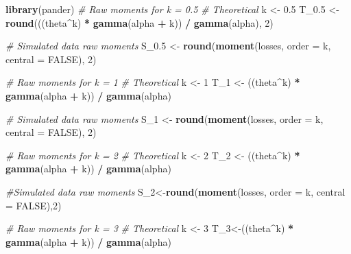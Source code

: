 \documentclass[]{book}
\newenvironment{Shaded}{\begin{snugshade}}{\end{snugshade}}
\newcommand{\KeywordTok}[1]{\textcolor[rgb]{0.13,0.29,0.53}{\textbf{#1}}}
\newcommand{\DataTypeTok}[1]{\textcolor[rgb]{0.13,0.29,0.53}{#1}}
\newcommand{\DecValTok}[1]{\textcolor[rgb]{0.00,0.00,0.81}{#1}}
\newcommand{\FloatTok}[1]{\textcolor[rgb]{0.00,0.00,0.81}{#1}}
\newcommand{\StringTok}[1]{\textcolor[rgb]{0.31,0.60,0.02}{#1}}
\newcommand{\CommentTok}[1]{\textcolor[rgb]{0.56,0.35,0.01}{\textit{#1}}}
\newcommand{\OtherTok}[1]{\textcolor[rgb]{0.56,0.35,0.01}{#1}}
\newcommand{\OperatorTok}[1]{\textcolor[rgb]{0.81,0.36,0.00}{\textbf{#1}}}
\newcommand{\NormalTok}[1]{#1}
\theoremstyle{definition}
\theoremstyle{definition}
\theoremstyle{definition}
\theoremstyle{remark}
\begin{document}
\begin{Shaded}
\begin{Highlighting}[]
\KeywordTok{library}\NormalTok{(pander)}
\CommentTok{# Raw moments for k = 0.5}
\CommentTok{# Theoretical }
\NormalTok{k <-}\StringTok{ }\FloatTok{0.5}
\NormalTok{T_}\FloatTok{0.5}\NormalTok{ <-}\StringTok{ }\KeywordTok{round}\NormalTok{(((theta}\OperatorTok{^}\NormalTok{k) }\OperatorTok{*}\StringTok{ }\KeywordTok{gamma}\NormalTok{(alpha }\OperatorTok{+}\StringTok{ }\NormalTok{k)) }\OperatorTok{/}\StringTok{ }\KeywordTok{gamma}\NormalTok{(alpha), }\DecValTok{2}\NormalTok{)}

\CommentTok{# Simulated data raw moments}
\NormalTok{S_}\FloatTok{0.5}\NormalTok{ <-}\StringTok{ }\KeywordTok{round}\NormalTok{(}\KeywordTok{moment}\NormalTok{(losses, }\DataTypeTok{order =}\NormalTok{ k, }\DataTypeTok{central =} \OtherTok{FALSE}\NormalTok{), }\DecValTok{2}\NormalTok{)}


\CommentTok{# Raw moments for k = 1}
\CommentTok{# Theoretical }
\NormalTok{k <-}\StringTok{ }\DecValTok{1}
\NormalTok{T_}\DecValTok{1}\NormalTok{ <-}\StringTok{ }\NormalTok{((theta}\OperatorTok{^}\NormalTok{k) }\OperatorTok{*}\StringTok{ }\KeywordTok{gamma}\NormalTok{(alpha }\OperatorTok{+}\StringTok{ }\NormalTok{k)) }\OperatorTok{/}\StringTok{ }\KeywordTok{gamma}\NormalTok{(alpha)}

\CommentTok{# Simulated data raw moments}
\NormalTok{S_}\DecValTok{1}\NormalTok{ <-}\StringTok{ }\KeywordTok{round}\NormalTok{(}\KeywordTok{moment}\NormalTok{(losses, }\DataTypeTok{order =}\NormalTok{ k, }\DataTypeTok{central =} \OtherTok{FALSE}\NormalTok{), }\DecValTok{2}\NormalTok{)}

\CommentTok{# Raw moments for k = 2}
\CommentTok{# Theoretical }
\NormalTok{k <-}\StringTok{ }\DecValTok{2}
\NormalTok{T_}\DecValTok{2}\NormalTok{ <-}\StringTok{ }\NormalTok{((theta}\OperatorTok{^}\NormalTok{k) }\OperatorTok{*}\StringTok{ }\KeywordTok{gamma}\NormalTok{(alpha }\OperatorTok{+}\StringTok{ }\NormalTok{k)) }\OperatorTok{/}\StringTok{ }\KeywordTok{gamma}\NormalTok{(alpha)}

\CommentTok{#Simulated data raw moments}
\NormalTok{S_}\DecValTok{2}\NormalTok{<-}\KeywordTok{round}\NormalTok{(}\KeywordTok{moment}\NormalTok{(losses, }\DataTypeTok{order =}\NormalTok{ k, }\DataTypeTok{central =} \OtherTok{FALSE}\NormalTok{),}\DecValTok{2}\NormalTok{)}

\CommentTok{# Raw moments for k = 3}
\CommentTok{# Theoretical }
\NormalTok{k <-}\StringTok{ }\DecValTok{3}
\NormalTok{T_}\DecValTok{3}\NormalTok{<-((theta}\OperatorTok{^}\NormalTok{k) }\OperatorTok{*}\StringTok{ }\KeywordTok{gamma}\NormalTok{(alpha }\OperatorTok{+}\StringTok{ }\NormalTok{k)) }\OperatorTok{/}\StringTok{ }\KeywordTok{gamma}\NormalTok{(alpha)}


\end{Highlighting}
\end{Shaded}
\end{document}
